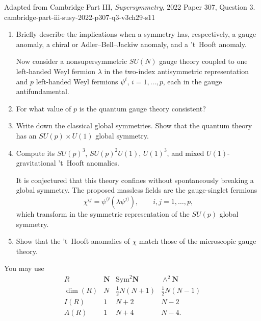 \begin{enumerate}
    {Adapted from Cambridge Part III, \emph{Supersymmetry}, 2022
    Paper 307, Question 3.}
    {cambridge-part-iii-susy-2022-p307-q3-v3ch29-s11}
  \begin{enumerate}
    \item[(a)]
    Briefly describe the implications when a symmetry has, respectively, a
    gauge anomaly, a chiral or Adler--Bell--Jackiw anomaly, and a 't~Hooft
    anomaly.

    Now consider a nonsupersymmetric \(SU(N)\) gauge theory coupled to one
    left-handed Weyl fermion \(\lambda\) in the two-index antisymmetric
    representation and \(p\) left-handed Weyl fermions \(\psi^i\),
    \(i=1,\ldots,p\), each in the gauge antifundamental.

    \item[(i)]
    For what value of \(p\) is the quantum gauge theory consistent?

    \item[(ii)]
    Write down the classical global symmetries.  Show that the quantum
    theory has an \(SU(p)\times U(1)\) global symmetry.

    \item[(iii)]
    Compute its \(SU(p)^3\), \(SU(p)^2U(1)\), \(U(1)^3\), and mixed
    \(U(1)\)-gravitational 't~Hooft anomalies.

    It is conjectured that this theory confines without spontaneously
    breaking a global symmetry.  The proposed massless fields are the
    gauge-singlet fermions
    \[
      \chi^{ij}=\psi^{(\ii}(\lambda\psi^{j)}),
      \qquad i,j=1,\ldots,p,
      \tag{29.11.1}
    \]
    which transform in the symmetric representation of the \(SU(p)\)
    global symmetry.

    \item[(iv)]
    Show that the 't~Hooft anomalies of \(\chi\) match those of the
    microscopic gauge theory.
  \end{enumerate}

  You may use
  \[
  \begin{array}{c|ccc}
    R&\boldsymbol N&\mathrm{Sym}^2\boldsymbol N&
      \wedge^2\boldsymbol N\\ \hline
    \dim(R)&N&\frac12N(N+1)&\frac12N(N-1)\\
    I(R)&1&N+2&N-2\\
    A(R)&1&N+4&N-4 .
  \end{array}
  \tag{29.11.2}
  \]


\end{enumerate}

